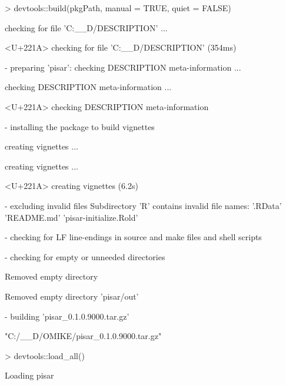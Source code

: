 \documentclass[a4paper,12pt]{article}\usepackage[]{graphicx}\usepackage[]{color}
\begin{document}
\begin{Schunk}
\begin{Sinput}
> devtools::build(pkgPath, manual = TRUE, quiet = FALSE)
\end{Sinput}
\begin{Soutput}
  
  
  
   checking for file 'C:\__D\OMIKE\pisar/DESCRIPTION' ...
  
<U+221A>  checking for file 'C:\__D\OMIKE\pisar/DESCRIPTION' (354ms)

  
  
  
-  preparing 'pisar':
   checking DESCRIPTION meta-information ...
  
   checking DESCRIPTION meta-information ... 
  
<U+221A>  checking DESCRIPTION meta-information

  
  
  
-  installing the package to build vignettes

  
  
  
   creating vignettes ...
  
   creating vignettes ... 
  
<U+221A>  creating vignettes (6.2s)

  
  
  
-  excluding invalid files
   Subdirectory 'R' contains invalid file names:
     '.RData' 'README.md' 'pisar-initialize.Rold'

  
  
  
-  checking for LF line-endings in source and make files and shell scripts

  
  
  
-  checking for empty or unneeded directories

  
Removed empty directory 
  
   Removed empty directory 'pisar/out'

  
  
  
-  building 'pisar_0.1.0.9000.tar.gz'

  
   


\end{Soutput}
\begin{Soutput}
[1] "C:/__D/OMIKE/pisar_0.1.0.9000.tar.gz"
\end{Soutput}
\begin{Sinput}
> devtools::load_all()
\end{Sinput}
\begin{Soutput}
Loading pisar
\end{Soutput}
\end{Schunk}
\end{document}
